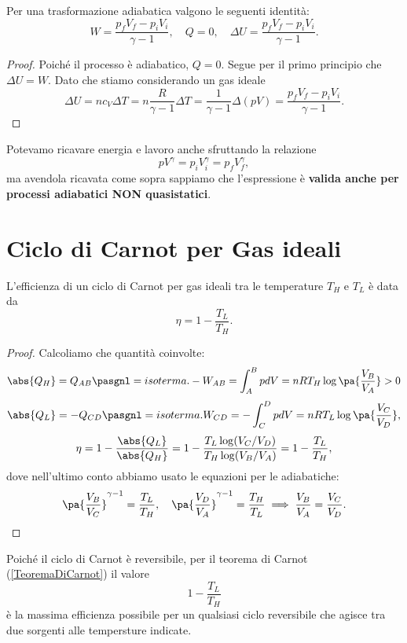 \begin{proposition}\label{EnergieAdiabatica}
Per una trasformazione adiabatica valgono le seguenti identit\`a:
\[W=\frac{p_fV_f-p_iV_i}{\gamma-1},\quad
Q=0,\quad
\Delta U=\frac{p_fV_f-p_iV_i}{\gamma-1}.\]
\end{proposition}
\begin{proof}
Poich\'e il processo \`e adiabatico, $Q=0$. Segue per il primo principio che $\Delta U=W$. Dato che stiamo considerando un gas ideale
\[\Delta U=nc_V\Delta T=n\frac R{\gamma-1}\Delta T=\frac 1{\gamma-1}\Delta (pV)=\frac{p_fV_f-p_iV_i}{\gamma-1}.\]
\end{proof}

\begin{remark}
Potevamo ricavare energia e lavoro anche sfruttando la relazione \[pV^\gamma=p_iV_i^\gamma=p_fV_f^\gamma,\] ma avendola ricavata come sopra sappiamo che l'espressione \`e \textbf{valida anche per processi adiabatici NON quasistatici}.
\end{remark}

\section{Ciclo di Carnot per Gas ideali}

\begin{proposition}\label{EfficienzaCicloCarnot}
L'efficienza di un ciclo di Carnot per gas ideali tra le temperature $T_H$ e $T_L$ \`e data da
\[\eta=1-\frac{T_L}{T_H}.\]
\end{proposition}
\begin{proof}
Calcoliamo che quantit\`a coinvolte:
\[\abs{Q_H}=Q_{AB}\pasgnl={isoterma.}-W_{AB}=\int_A^BpdV=nRT_H\log\pa{\frac{V_B}{V_A}}>0\]
\[\abs{Q_L}=-Q_{CD}\pasgnl={isoterma.}W_{CD}=-\int_C^DpdV=nRT_L\log\pa{\frac{V_C}{V_D}},\]
\[\eta=1-\frac{\abs{Q_L}}{\abs{Q_H}}=1-\frac{T_L\log(V_C/V_D)}{T_H\log(V_B/V_A)}=1-\frac{T_L}{T_H},\]
dove nell'ultimo conto abbiamo usato le equazioni per le adiabatiche:
\[\pa{\frac{V_B}{V_C}}^{\gamma-1}=\frac{T_L}{T_H},\quad \pa{\frac{V_D}{V_A}}^{\gamma-1}=\frac{T_H}{T_L}\implies \frac{V_B}{V_A}=\frac{V_C}{V_D}.\]
\end{proof}

\begin{remark}
Poich\'e il ciclo di Carnot \`e reversibile, per il teorema di Carnot (\ref{TeoremaDiCarnot}) il valore
\[1-\frac{T_L}{T_H}\]
\`e la massima efficienza possibile per un qualsiasi ciclo reversibile che agisce tra due sorgenti alle tempersture indicate.
\end{remark}

